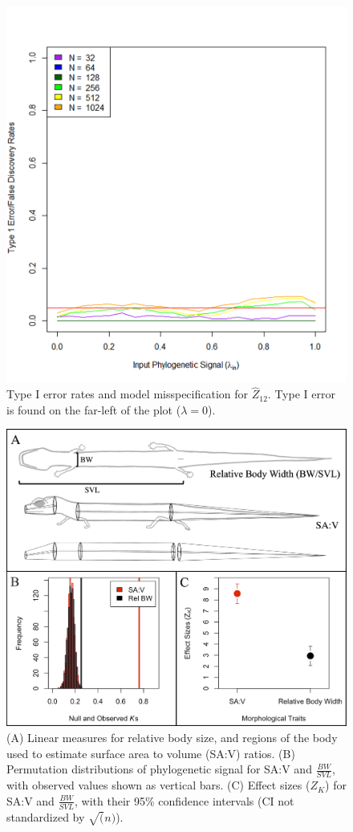 \documentclass[
]{article}
\begin{document}
\newpage

\begin{figure}
\includegraphics[width=28.51in,height=0.75\textheight]{Figs/fig.4} \caption{Type I error rates and model misspecification for $\hat{Z}_{12}$. Type I error is found on the far-left of the plot ($\lambda = 0$).}\label{fig:unnamed-chunk-6}
\end{figure}

\newpage

\begin{figure}
\includegraphics[width=0.9\linewidth]{Figs/fig.5} \caption{(A) Linear measures for relative body size, and regions of the body used to estimate surface area to volume (SA:V) ratios. (B) Permutation distributions of phylogenetic signal for SA:V and $\frac{BW}{SVL}$, with observed values shown as vertical bars. (C) Effect sizes ($Z_K$) for SA:V and $\frac{BW}{SVL}$, with their 95\% confidence intervals (CI not standardized by $\sqrt(n)$).}\label{fig:unnamed-chunk-7}
\end{figure}
\end{document}
